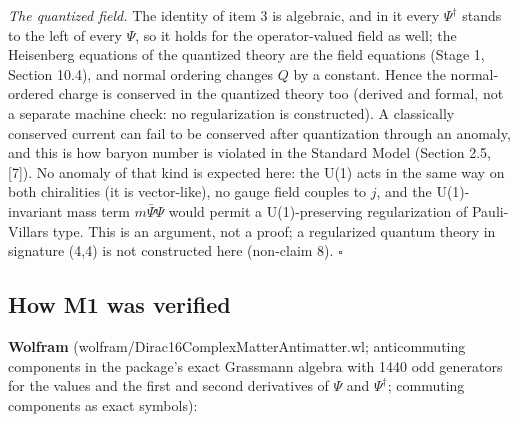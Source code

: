 \documentclass[11pt]{article}
\begin{document}
\emph{The quantized field.} The identity of item 3 is algebraic, and in it every $\Psi^\dagger$ stands to the left of every $\Psi$, so it holds for the operator-valued field as well; the Heisenberg equations of the quantized theory are the field equations (Stage 1, Section 10.4), and normal ordering changes $Q$ by a constant. Hence the normal-ordered charge is conserved in the quantized theory too (derived and formal, not a separate machine check: no regularization is constructed). A classically conserved current can fail to be conserved after quantization through an anomaly, and this is how baryon number is violated in the Standard Model (Section 2.5, [7]). No anomaly of that kind is expected here: the U(1) acts in the same way on both chiralities (it is vector-like), no gauge field couples to $j$, and the U(1)-invariant mass term $m\bar\Psi\Psi$ would permit a U(1)-preserving regularization of Pauli-Villars type. This is an argument, not a proof; a regularized quantum theory in signature (4,4) is not constructed here (non-claim 8). $\square$

\subsection{How M1 was verified}

\textbf{Wolfram} (wolfram/Dirac16ComplexMatterAntimatter.wl; anticommuting components in the package's exact Grassmann algebra with 1440 odd generators for the values and the first and second derivatives of $\Psi$ and $\Psi^\dagger$; commuting components as exact symbols):
\end{document}
